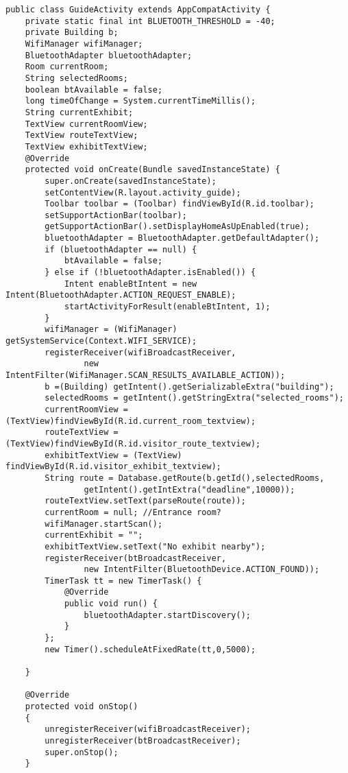 \begin{lstlisting}
public class GuideActivity extends AppCompatActivity {
    private static final int BLUETOOTH_THRESHOLD = -40;
    private Building b;
    WifiManager wifiManager;
    BluetoothAdapter bluetoothAdapter;
    Room currentRoom;
    String selectedRooms;
    boolean btAvailable = false;
    long timeOfChange = System.currentTimeMillis();
    String currentExhibit;
    TextView currentRoomView;
    TextView routeTextView;
    TextView exhibitTextView;
    @Override
    protected void onCreate(Bundle savedInstanceState) {
        super.onCreate(savedInstanceState);
        setContentView(R.layout.activity_guide);
        Toolbar toolbar = (Toolbar) findViewById(R.id.toolbar);
        setSupportActionBar(toolbar);
        getSupportActionBar().setDisplayHomeAsUpEnabled(true);
        bluetoothAdapter = BluetoothAdapter.getDefaultAdapter();
        if (bluetoothAdapter == null) {
            btAvailable = false;
        } else if (!bluetoothAdapter.isEnabled()) {
            Intent enableBtIntent = new Intent(BluetoothAdapter.ACTION_REQUEST_ENABLE);
            startActivityForResult(enableBtIntent, 1);
        }
        wifiManager = (WifiManager) getSystemService(Context.WIFI_SERVICE);
        registerReceiver(wifiBroadcastReceiver,
                new IntentFilter(WifiManager.SCAN_RESULTS_AVAILABLE_ACTION));
        b =(Building) getIntent().getSerializableExtra("building");
        selectedRooms = getIntent().getStringExtra("selected_rooms");
        currentRoomView = (TextView)findViewById(R.id.current_room_textview);
        routeTextView = (TextView)findViewById(R.id.visitor_route_textview);
        exhibitTextView = (TextView) findViewById(R.id.visitor_exhibit_textview);
        String route = Database.getRoute(b.getId(),selectedRooms,
                getIntent().getIntExtra("deadline",10000));
        routeTextView.setText(parseRoute(route));
        currentRoom = null; //Entrance room?
        wifiManager.startScan();
        currentExhibit = "";
        exhibitTextView.setText("No exhibit nearby");
        registerReceiver(btBroadcastReceiver,
                new IntentFilter(BluetoothDevice.ACTION_FOUND));
        TimerTask tt = new TimerTask() {
            @Override
            public void run() {
                bluetoothAdapter.startDiscovery();
            }
        };
        new Timer().scheduleAtFixedRate(tt,0,5000);

    }

    @Override
    protected void onStop()
    {
        unregisterReceiver(wifiBroadcastReceiver);
        unregisterReceiver(btBroadcastReceiver);
        super.onStop();
    }


\end{lstlisting}
